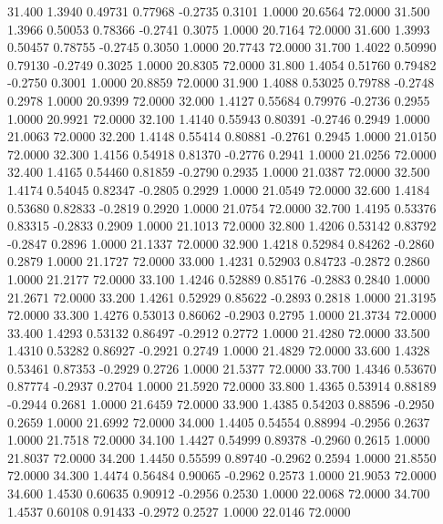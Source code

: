   31.400   1.3940   0.49731   0.77968  -0.2735   0.3101   1.0000  20.6564  72.0000
  31.500   1.3966   0.50053   0.78366  -0.2741   0.3075   1.0000  20.7164  72.0000
  31.600   1.3993   0.50457   0.78755  -0.2745   0.3050   1.0000  20.7743  72.0000
  31.700   1.4022   0.50990   0.79130  -0.2749   0.3025   1.0000  20.8305  72.0000
  31.800   1.4054   0.51760   0.79482  -0.2750   0.3001   1.0000  20.8859  72.0000
  31.900   1.4088   0.53025   0.79788  -0.2748   0.2978   1.0000  20.9399  72.0000
  32.000   1.4127   0.55684   0.79976  -0.2736   0.2955   1.0000  20.9921  72.0000
  32.100   1.4140   0.55943   0.80391  -0.2746   0.2949   1.0000  21.0063  72.0000
  32.200   1.4148   0.55414   0.80881  -0.2761   0.2945   1.0000  21.0150  72.0000
  32.300   1.4156   0.54918   0.81370  -0.2776   0.2941   1.0000  21.0256  72.0000
  32.400   1.4165   0.54460   0.81859  -0.2790   0.2935   1.0000  21.0387  72.0000
  32.500   1.4174   0.54045   0.82347  -0.2805   0.2929   1.0000  21.0549  72.0000
  32.600   1.4184   0.53680   0.82833  -0.2819   0.2920   1.0000  21.0754  72.0000
  32.700   1.4195   0.53376   0.83315  -0.2833   0.2909   1.0000  21.1013  72.0000
  32.800   1.4206   0.53142   0.83792  -0.2847   0.2896   1.0000  21.1337  72.0000
  32.900   1.4218   0.52984   0.84262  -0.2860   0.2879   1.0000  21.1727  72.0000
  33.000   1.4231   0.52903   0.84723  -0.2872   0.2860   1.0000  21.2177  72.0000
  33.100   1.4246   0.52889   0.85176  -0.2883   0.2840   1.0000  21.2671  72.0000
  33.200   1.4261   0.52929   0.85622  -0.2893   0.2818   1.0000  21.3195  72.0000
  33.300   1.4276   0.53013   0.86062  -0.2903   0.2795   1.0000  21.3734  72.0000
  33.400   1.4293   0.53132   0.86497  -0.2912   0.2772   1.0000  21.4280  72.0000
  33.500   1.4310   0.53282   0.86927  -0.2921   0.2749   1.0000  21.4829  72.0000
  33.600   1.4328   0.53461   0.87353  -0.2929   0.2726   1.0000  21.5377  72.0000
  33.700   1.4346   0.53670   0.87774  -0.2937   0.2704   1.0000  21.5920  72.0000
  33.800   1.4365   0.53914   0.88189  -0.2944   0.2681   1.0000  21.6459  72.0000
  33.900   1.4385   0.54203   0.88596  -0.2950   0.2659   1.0000  21.6992  72.0000
  34.000   1.4405   0.54554   0.88994  -0.2956   0.2637   1.0000  21.7518  72.0000
  34.100   1.4427   0.54999   0.89378  -0.2960   0.2615   1.0000  21.8037  72.0000
  34.200   1.4450   0.55599   0.89740  -0.2962   0.2594   1.0000  21.8550  72.0000
  34.300   1.4474   0.56484   0.90065  -0.2962   0.2573   1.0000  21.9053  72.0000
  34.600   1.4530   0.60635   0.90912  -0.2956   0.2530   1.0000  22.0068  72.0000
  34.700   1.4537   0.60108   0.91433  -0.2972   0.2527   1.0000  22.0146  72.0000
